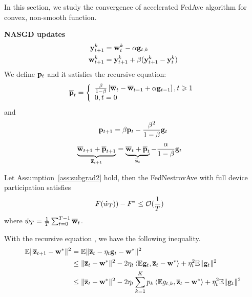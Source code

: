 
In this section, we study the convergence of accelerated FedAve 
algorithm for convex, non-smooth function.

\textbf{NASGD updates}
\begin{align}
	{\mathbf{y}}^k_{t+1} &= {\mathbf{w}}^k_{t} - \alpha  {\mathbf{g}}_{t,k}	\\
	{\mathbf{w}}^k_{t+1} & = {\mathbf{y}}^k_{t+1} + \beta({\mathbf{y}}^k_{t+1} - {\mathbf{y}}^k_{t})
\end{align}
We define ${\mathbf{p}}_t$ and it satisfies the recursive equation:
\begin{align}
	{\overline{\mathbf{p}}}_{t}=\left\{\begin{array}{l}\frac{\beta}{1-\beta}\left[{\overline{\mathbf{w}}}_{t}-{\overline{\mathbf{w}}}_{t-1}+\alpha {\mathbf{g}}_{t-1}\right], t \geqslant 1 \\ 0, t=0\end{array}\right.
\end{align}
and 
\begin{align}
	{\mathbf{p}}_{t+1} =  \beta {\mathbf{p}}_t - \frac{\beta^2}{1 - \beta} {\mathbf{g}}_t
	\label{eq:recursivep}
\end{align}
\begin{align}
	\underbrace{\overline{{\mathbf{w}}}_{t+1} + \overline{{\mathbf{p}}}_{t+1}}_{\overline{{\mathbf{z}}}_{t+1}} &= \underbrace{\overline{{\mathbf{w}}}_{t} + \overline{{\mathbf{p}}}_{t}}_{\overline{{\mathbf{z}}}_{t}} - \frac{\alpha}{1- \beta} {\mathbf{g}}_t
	\label{eq:nasgdzt}
\end{align}


\begin{theorem}
	Let Assumption~\ref{ass:subgrad2} hold, 
	then the FedNestrovAve with full device participation satisfies
	\begin{align}
		 F(\hat{w}_T)) - F^* &\leq {\mathcal{O}}(\frac{1}{T})
	\end{align}
	where $\hat{w}_T = \frac{1}{T}\sum_{t=0}^{T-1} {\overline{\mathbf{w}}}_t$.
	\label{th:nasgcvxnonsmoth}
\end{theorem}

With the recursive equation \eq{\ref{eq:nasgdzt}}, we have the following 
inequality.
\begin{align}
	\mathbb{E}\|\overline{{\mathbf{z}}}_{t+1} - {\mathbf{w}}^* \|^2  &= \mathbb{E}\|\overline{{\mathbf{z}}}_{t} - \eta_t{\mathbf{g}}_t - {\mathbf{w}}^* \|^2 \\
& \leq  \| \overline{{\mathbf{z}}}_{t} - {\mathbf{w}}^*\|^2  - 2\eta_t\left<\mathbb{E}{\mathbf{g}}_t, \overline{{\mathbf{z}}}_{t} - {\mathbf{w}}^*\right> +  \eta_t^2\mathbb{E}\|{\mathbf{g}}_t\|^2 \\
& \leq  \| \overline{{\mathbf{z}}}_{t} - {\mathbf{w}}^*\|^2  - 2\eta_t\sum_{k=1}^K p_k\left<\mathbb{E} g_{t,k}, \overline{{\mathbf{z}}}_{t} - {\mathbf{w}}^*\right> +  \eta_t^2\mathbb{E}\|{\mathbf{g}}_t\|^2 \label{eq:nagcvx1}
\end{align}

